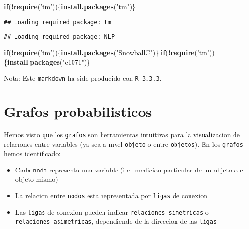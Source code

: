 \documentclass[11pt,]{article}
\newenvironment{Shaded}{\begin{snugshade}}{\end{snugshade}}
\newcommand{\KeywordTok}[1]{\textcolor[rgb]{0.13,0.29,0.53}{\textbf{#1}}}
\newcommand{\StringTok}[1]{\textcolor[rgb]{0.31,0.60,0.02}{#1}}
\newcommand{\ControlFlowTok}[1]{\textcolor[rgb]{0.13,0.29,0.53}{\textbf{#1}}}
\newcommand{\OperatorTok}[1]{\textcolor[rgb]{0.81,0.36,0.00}{\textbf{#1}}}
\newcommand{\NormalTok}[1]{#1}
\begin{document}
\begin{Shaded}
\begin{Highlighting}[]
\ControlFlowTok{if}\NormalTok{(}\OperatorTok{!}\KeywordTok{require}\NormalTok{(}\StringTok{'tm'}\NormalTok{))\{}\KeywordTok{install.packages}\NormalTok{(}\StringTok{"tm"}\NormalTok{)\}}
\end{Highlighting}
\end{Shaded}

\begin{verbatim}
## Loading required package: tm
\end{verbatim}

\begin{verbatim}
## Loading required package: NLP
\end{verbatim}

\begin{Shaded}
\begin{Highlighting}[]
\ControlFlowTok{if}\NormalTok{(}\OperatorTok{!}\KeywordTok{require}\NormalTok{(}\StringTok{'tm'}\NormalTok{))\{}\KeywordTok{install.packages}\NormalTok{(}\StringTok{"SnowballC"}\NormalTok{)\}}
\ControlFlowTok{if}\NormalTok{(}\OperatorTok{!}\KeywordTok{require}\NormalTok{(}\StringTok{'tm'}\NormalTok{))\{}\KeywordTok{install.packages}\NormalTok{(}\StringTok{"e1071"}\NormalTok{)\}}
\end{Highlighting}
\end{Shaded}

Nota: Este \texttt{markdown} ha sido producido con \texttt{R-3.3.3}.

\section{Grafos probabilisticos}\label{grafos-probabilisticos}

Hemos visto que los \texttt{grafos} son herramientas intuitivas para la
visualizacion de relaciones entre variables (ya sea a nivel
\texttt{objeto} o entre \texttt{objetos}). En los \texttt{grafos} hemos
identificado:

\begin{itemize}
\item
  Cada \texttt{nodo} representa una variable (i.e.~medicion particular
  de un objeto o el objeto mismo)
\item
  La relacion entre \texttt{nodos} esta representada por \texttt{ligas}
  de conexion
\item
  Las \texttt{ligas} de conexion pueden indicar
  \texttt{relaciones\ simetricas} o \texttt{relaciones\ asimetricas},
  dependiendo de la direccion de las \texttt{ligas}
\end{itemize}
\end{document}

